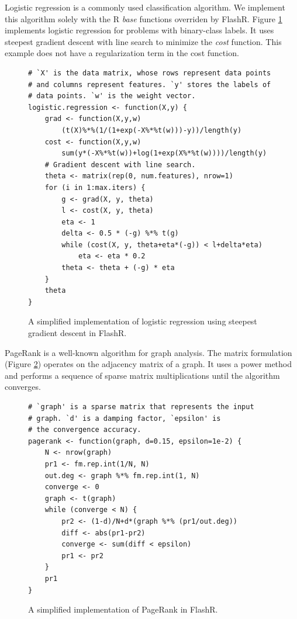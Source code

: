 Logistic regression is a commonly used classification algorithm.
We implement this algorithm solely with the R \textit{base} functions
overriden by FlashR. Figure
\ref{logistic} implements logistic regression for problems with binary-class
labels. It uses steepest gradient descent with line search to minimize
the \textit{cost} function. This example does not have a regularization term
in the cost function.
\begin{figure}
\begin{verbatim}
# `X' is the data matrix, whose rows represent data points
# and columns represent features. `y' stores the labels of
# data points. `w' is the weight vector.
logistic.regression <- function(X,y) {
	grad <- function(X,y,w)
		(t(X)%*%(1/(1+exp(-X%*%t(w)))-y))/length(y)
	cost <- function(X,y,w)
		sum(y*(-X%*%t(w))+log(1+exp(X%*%t(w))))/length(y)
	# Gradient descent with line search.
	theta <- matrix(rep(0, num.features), nrow=1)
	for (i in 1:max.iters) {
		g <- grad(X, y, theta)
		l <- cost(X, y, theta)
		eta <- 1
		delta <- 0.5 * (-g) %*% t(g)
		while (cost(X, y, theta+eta*(-g)) < l+delta*eta)
			eta <- eta * 0.2
		theta <- theta + (-g) * eta
	}
	theta
}
\end{verbatim}
\vspace{-10pt}
\caption{A simplified implementation of logistic regression using
steepest gradient descent in FlashR.}
\label{logistic}
\vspace{-5pt}
\end{figure}

PageRank is a well-known algorithm for graph analysis. The matrix formulation
(Figure \ref{pagerank}) operates on the adjacency matrix of a graph. It uses
a power method and performs a sequence of sparse matrix multiplications until
the algorithm converges.
\begin{figure}
\begin{verbatim}
# `graph' is a sparse matrix that represents the input
# graph. `d' is a damping factor, `epsilon' is
# the convergence accuracy.
pagerank <- function(graph, d=0.15, epsilon=1e-2) {
	N <- nrow(graph)
	pr1 <- fm.rep.int(1/N, N)
	out.deg <- graph %*% fm.rep.int(1, N)
	converge <- 0
	graph <- t(graph)
	while (converge < N) {
		pr2 <- (1-d)/N+d*(graph %*% (pr1/out.deg))
		diff <- abs(pr1-pr2)
		converge <- sum(diff < epsilon)
		pr1 <- pr2
	}
	pr1
}
\end{verbatim}
\vspace{-10pt}
\caption{A simplified implementation of PageRank in FlashR.}
\label{pagerank}
\vspace{-10pt}
\end{figure}
